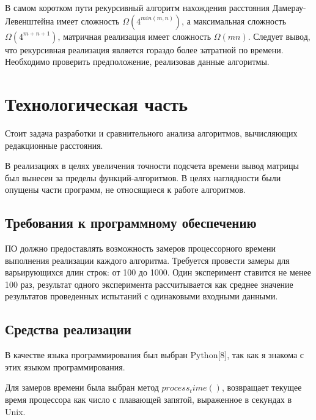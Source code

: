 \documentclass[a4paper,14pt]{article} %
\begin{document}
	В самом коротком пути рекурсивный алгоритм нахождения расстояния Дамерау-Левенштейна имеет сложность $\Omega(4^{min(m,n)})$, а максимальная сложность $\Omega(4^{m + n + 1})$, матричная реализация имеет сложность $\Omega(mn)$. Следует вывод, что рекурсивная реализация является гораздо более затратной по времени. Необходимо проверить предположение, реализовав данные алгоритмы. 

    \newpage

        \section{Технологическая часть}
        
        \hfill
        
        Стоит задача разработки и сравнительного анализа алгоритмов, вычисляющих редакционные расстояния. 
        \hfill
        
        В реализациях в целях увеличения точности подсчета времени вывод матрицы был вынесен за пределы функций-алгоритмов. В целях наглядности были опущены части программ, не относящиеся к работе алгоритмов.
        
        \subsection{Требования к программному обеспечению}
        \hfill
        
        ПО должно предоставлять возможность замеров процессорного времени выполнения реализации каждого алгоритма. Требуется провести замеры для варьирующихся длин строк: от 100 до 1000. Один эксперимент ставится не менее 100 раз, результат одного эксперимента рассчитывается как среднее значение результатов проведенных испытаний с одинаковыми входными данными.
        \hfill
        
        \subsection{Средства реализации}
        \hfill
        
        В качестве языка программирования был выбран Python[8], так как я знакома с этих языком программирования. 
        
        \hfill
        
        Для замеров времени была выбран метод $process_time()$, возвращает текущее время процессора как число с плавающей запятой, выраженное в секундах в Unix.
        \hfill
        
\end{document}
